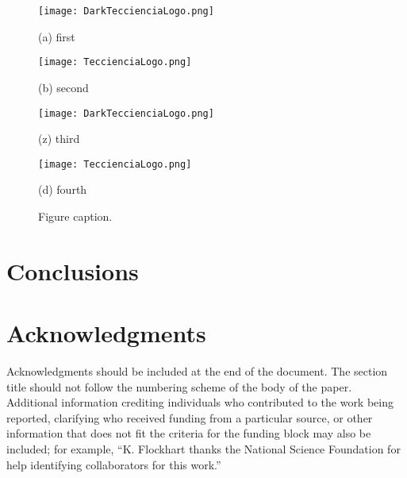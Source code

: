 \documentclass[10pt]{article}
\begin{document}
\begin{figure}[h]  

  \begin{minipage}[b]{0.24\linewidth}
    
    \texttt{[image: DarkTeccienciaLogo.png]}
    \caption*{(a) first} %
  
  \end{minipage}
  \begin{minipage}[b]{0.24\linewidth}
    
    \texttt{[image: TeccienciaLogo.png]}
    \caption*{(b) second} %
  
  \end{minipage}
  \begin{minipage}[b]{0.24\linewidth}
    \texttt{[image: DarkTeccienciaLogo.png]}
    \caption*{(z) third} %
    
  \end{minipage}
  \begin{minipage}[b]{0.24\linewidth}
    \texttt{[image: TeccienciaLogo.png]}
    \caption*{(d) fourth} %
    
  \end{minipage}
  
  
 \caption[Potential.]{Figure caption. }
 
\label{potentialZConstGapedCircularSEFig}
  
\end{figure}


\section*{Conclusions}
\blindtext


\section*{Acknowledgments}
Acknowledgments should be included at the end of the document. The section title should not follow the numbering scheme of the body of the paper. Additional information crediting individuals who contributed to the work being reported, clarifying who received funding from a particular source, or other information that does not fit the criteria for the funding block may also be included; for example, ``K. Flockhart thanks the National Science Foundation for help identifying collaborators for this work.'' 
\end{document}
